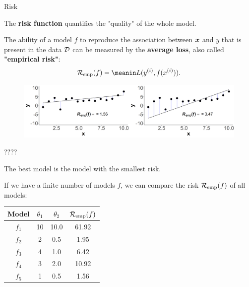 \documentclass[11pt,compress,t,notes=noshow, xcolor=table]{beamer}
\begin{document}
\begin{vbframe}{Risk}

The \textbf{risk function} quantifies the "quality" of the whole model. 

\lz

The ability of a model $f$ to reproduce the association between $\bm{x}$ and $y$ that is present in the data $\mathcal{D}$ can be measured by the \textbf{average loss}, also called \textbf{"empirical risk"}: \\

  $$
  \riskef = \meanin \Lxyi.
  $$  
        

\vfill

\begin{center}
\begin{figure}[!b]
\includegraphics[width=1\textwidth]{figure/ml-basic_riskmin-2-risk.png}
\end{figure}
\end{center}
   
\vspace*{0.1cm}   
   
\end{vbframe}

\begin{vbframe}{???? }

The best model is the model with the smallest risk. 

\lz

If we have a finite number of models $f$, we can compare the risk $\mathcal{R}_{\text{emp}}(f)$ of all models: 
\begin{center}
\begin{tabular}{ c | c | c || c }
 Model & \(\displaystyle \theta_1 \) & \(\displaystyle \theta_2 \) & \(\displaystyle \mathcal{R}_{\text{emp}}(f) \) \\ 
 \hline
\(\displaystyle f_1 \)  &    10   & 10.0 & 61.92 \\
\(\displaystyle f_2 \)   &    2  &   0.5 & 1.95\\
\(\displaystyle f_3 \)   &    4  &   1.0 & 6.42\\
\(\displaystyle f_4 \)   &    3  &   2.0 &10.92\\
\rowcolor{lightgray}
\(\displaystyle f_5 \)   &    1  &   0.5 & 1.56\\
\end{tabular}
\end{center}


\end{vbframe}
\end{document}
